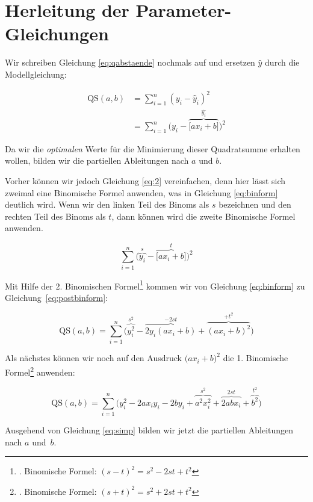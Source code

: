 \documentclass[ngerman, 12pt,parskip=half]{scrartcl}
\def\qs{\text{QS}(a,b)}
\def\sm{\sum\limits_{i=1}^{n}}
\begin{document}
\section{Herleitung der Parameter-Gleichungen}

Wir schreiben Gleichung \ref{eq:qabstaende} nochmals auf und ersetzen \(\hat y\) durch die Modellgleichung:

\begin{align}\label{eq:1}
\qs	&  = \sm \left(y_i - \hat{y}_i\right)^2\\
								&= \sm \Big(y_i - \overbrace{\big[ax_i+b\big]}^{\hat{y_i}}\Big)^2 \label{eq:2}
\end{align}

Da wir die \textit{optimalen} Werte für die Minimierung dieser Quadratsumme erhalten wollen, bilden wir die partiellen Ableitungen nach \(a\) und \(b\). 

Vorher können wir jedoch Gleichung \ref{eq:2} vereinfachen, denn hier lässt sich zweimal eine Binomische Formel anwenden, was in Gleichung \ref{eq:binform} deutlich wird. Wenn wir den linken Teil des Binoms als \(s\) bezeichnen und den rechten Teil des Binoms als \(t\), dann können wird die zweite Binomische Formel anwenden.

\begin{equation}
\sm \Big( \overbrace{y_i}^{s} - \overbrace{\big[ax_i+b\big]}^{t}  \Big)^2 \label{eq:binform}
\end{equation}

Mit Hilfe der 2. Binomischen Formel\footnote{. Binomische Formel: \((s-t)^2 = s^2 -2st + t^2\)} kommen wir von Gleichung \ref{eq:binform} zu Gleichung~\ref{eq:postbinform}:


\begin{equation}
	\qs = \sm \Big( \overbrace{y_i^2}^{s^2} - \overbrace{2y_i (ax_i+b)}^{-2st} + \overbrace{(ax_i +b)^2}^{+t^2}\Big) \label{eq:postbinform}
\end{equation}

Als nächstes können wir noch auf den Ausdruck \(\big(ax_i + b\big)^2 \) die 1. Binomische Formel\footnote{. Binomische Formel: \((s+t)^2 = s^2 +2st + t^2\)} anwenden:


\begin{equation}
	\qs = \sm \Big(y_i^2 - 2ax_iy_i - 2by_i + \overbrace{a^2x_i^2}^{s^2} + \overbrace{2abx_i}^{2st} + \overbrace{b^2}^{t^2}\Big)\label{eq:simp}
\end{equation}

Ausgehend von Gleichung \ref{eq:simp} bilden wir jetzt die partiellen Ableitungen nach \(a\) und~\(b\). 
\end{document}

